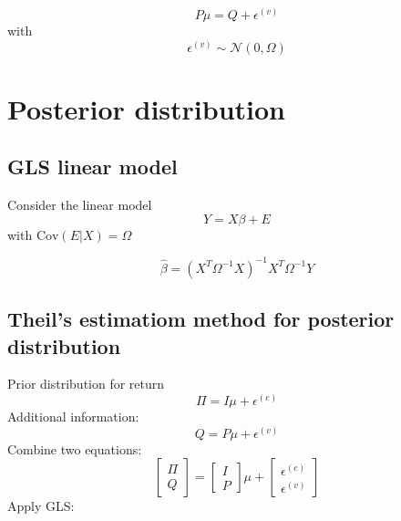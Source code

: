 \documentclass[
]{article}
\begin{document}
\[
P \mu = Q + \epsilon^{(v)}
\] with \[
\epsilon^{(v)} \sim \mathcal{N}(0, \Omega)
\]

\hypertarget{posterior-distribution}{%
\section{Posterior distribution}\label{posterior-distribution}}

\hypertarget{gls-linear-model}{%
\subsection{GLS linear model}\label{gls-linear-model}}

Consider the linear model \[
Y = X \beta + E
\] with \(\textrm{Cov}(E|X) = \Omega\)

\[
\hat{\beta} = (X^T \Omega^{-1}X)^{-1} X^T \Omega^{-1} Y
\]

\hypertarget{theils-estimatiom-method-for-posterior-distribution}{%
\subsection{Theil's estimatiom method for posterior
distribution}\label{theils-estimatiom-method-for-posterior-distribution}}

Prior distribution for return \[
\Pi = I \mu + \epsilon^{(e)}
\] Additional information: \[
Q = P \mu + \epsilon^{(v)}
\] Combine two equations: \[
\begin{bmatrix}
\Pi \\ 
Q
\end{bmatrix}
 = 
\begin{bmatrix}
I \\ 
P
\end{bmatrix}
\mu + 
\begin{bmatrix}
\epsilon^{(e)} \\ 
\epsilon^{(v)}  
\end{bmatrix}
\] Apply GLS:

\def\O{
\begin{bmatrix}
\tau \Sigma & \\
& \Omega
\end{bmatrix}
}

\def\X{
\begin{bmatrix}
I \\ 
P
\end{bmatrix}
}
\end{document}
